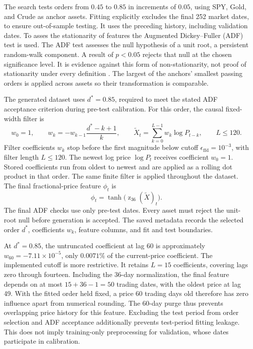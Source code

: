 The search tests orders from \(0.45\) to \(0.85\) in increments of \(0.05\), using SPY, Gold, and Crude as anchor assets. Fitting explicitly excludes the final 252 market dates, to ensure out-of-sample testing. It uses the preceding history, including validation dates. To asses the stationarity of features the Augmented Dickey--Fuller (ADF) test is used. The ADF test assesses the null hypothesis of a unit root, a persistent random-walk component. A result of \(p<0.05\) rejects that null at the chosen significance level. It is evidence against this form of non-stationarity, not proof of stationarity under every definition \cite{LopezdePrado.2018}. The largest of the anchors' smallest passing orders is applied across assets so their transformation is comparable.

The generated dataset uses \(d^\ast=0.85\), required to meet the stated ADF acceptance criterion during pre-test calibration. For this order, the causal fixed-width filter is
\begin{equation}
w_0=1,\qquad w_k=-w_{k-1}\frac{d^\ast-k+1}{k},\qquad
\widetilde X_t=\sum_{k=0}^{L-1}w_k\log P_{t-k},\qquad L\leq120.
\label{eq:feature-ffd-filter}
\end{equation}
Filter coefficients \(w_k\) stop before the first magnitude below cutoff \(\epsilon_{\mathrm{ffd}}=10^{-3}\), with filter length \(L\leq120\). The newest log price \(\log P_t\) receives coefficient \(w_0=1\). Stored coefficients run from oldest to newest and are applied as a rolling dot product in that order. The same finite filter is applied throughout the dataset. The final fractional-price feature \(\phi_t\) is
\begin{equation}
\phi_t=\tanh\!\big(\operatorname z_{36}(\widetilde X)_t\big).
\label{eq:feature-ffd}
\end{equation}
The final ADF checks use only pre-test dates. Every asset must reject the unit-root null before generation is accepted. The saved metadata records the selected order \(d^\ast\), coefficients \(w_k\), feature columns, and fit and test boundaries.

At \(d^\ast=0.85\), the untruncated coefficient at lag 60 is approximately \(w_{60}=-7.11\times10^{-5}\), only \(0.0071\%\) of the current-price coefficient. The implemented cutoff is more restrictive. It retains \(L=15\) coefficients, covering lags zero through fourteen. Including the 36-day normalization, the final feature depends on at most \(15+36-1=50\) trading dates, with the oldest price at lag 49. With the fitted order held fixed, a price 60 trading days old therefore has zero influence apart from numerical rounding. The 60-day purge thus prevents overlapping price history for this feature. Excluding the test period from order selection and ADF acceptance additionally prevents test-period fitting leakage. This does not imply training-only preprocessing for validation, whose dates participate in calibration.

